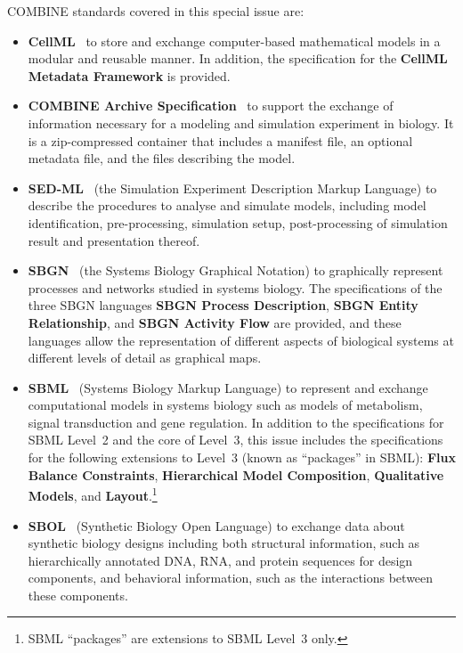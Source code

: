\documentclass{jib}
\begin{document}
COMBINE standards covered in this special issue are:
\begin{itemize}
\item {\bf CellML}~\cite{cuellar2003overview} to store and exchange computer-based mathematical models in a modular and reusable manner. 
In addition, the specification for the {\bf CellML Metadata Framework} is provided.

\item {\bf COMBINE Archive Specification}~\cite{Bergmann2014combine} to support the exchange of information necessary for a modeling and simulation experiment in biology. 
It is a zip-compressed container that includes a manifest file, an optional metadata file, and the files describing the model. 

\item {\bf SED-ML}~\cite{sedml2011} (the Simulation Experiment Description Markup Language) to describe the procedures to analyse and simulate  models, including model identification, pre-processing, simulation setup, post-processing of simulation result and presentation thereof.

\item {\bf SBGN}~\cite{le2009systems} (the Systems Biology Graphical Notation) to graphically represent processes and networks studied in systems biology. 
The specifications of the three SBGN languages {\bf SBGN Process Description}, {\bf SBGN Entity Relationship}, and {\bf SBGN Activity Flow} are provided, and these languages allow the representation of different aspects of biological systems at different levels of detail as  graphical maps.

\item {\bf SBML}~\cite{hucka2003} (Systems Biology Markup Language) to represent and exchange computational models in systems biology such as models of metabolism, signal transduction and gene regulation.  In addition to the specifications for SBML Level~2 and the core of Level~3, this issue includes the specifications for the following extensions to Level~3 (known as ``packages'' in SBML): {\bf Flux Balance Constraints}, {\bf Hierarchical Model Composition}, {\bf Qualitative Models}, and {\bf Layout}.\footnote{SBML ``packages'' are extensions to SBML Level~3 only.}

\item {\bf SBOL}~\cite{galdzicki2014} (Synthetic Biology Open Language) to exchange data about synthetic biology designs including both structural information, such as hierarchically annotated DNA, RNA, and protein sequences for design components, and behavioral information, such as the interactions between these components. 
\end{itemize}
\end{document}
